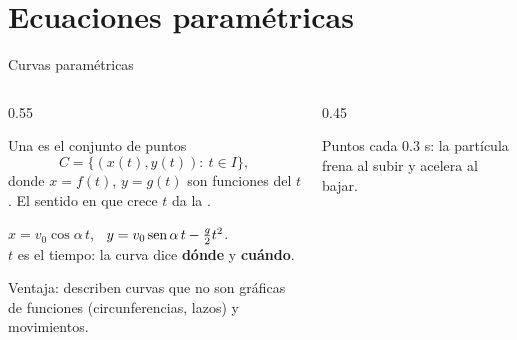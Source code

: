 \documentclass[10pt,aspectratio=169]{beamer}
\begin{document}
\section{Ecuaciones paramétricas}

\begin{frame}{Curvas paramétricas}
  \begin{columns}
    \begin{column}{0.55\textwidth}
      \begin{definicion}
        Una  es el conjunto de puntos
        \[ C=\{(x(t),y(t)):\ t\in I\}, \]
        donde $x=f(t)$, $y=g(t)$ son funciones del  $t$. El sentido en que crece $t$ da la .
      \end{definicion}
      \begin{ejemplo}
        $x=v_0\cos\alpha\,t$, \ $y=v_0\operatorname{sen}\alpha\,t-\frac g2t^2$.\\
        $t$ es el tiempo: la curva dice \textbf{dónde} y \textbf{cuándo}.
      \end{ejemplo}
      \small Ventaja: describen curvas que no son gráficas de funciones (circunferencias, lazos) y movimientos.
    \end{column}
    \begin{column}{0.45\textwidth}
      \centering

      \small Puntos cada $0.3$ s: la partícula frena al subir y acelera al bajar.
    \end{column}
  \end{columns}
\end{frame}
\end{document}
